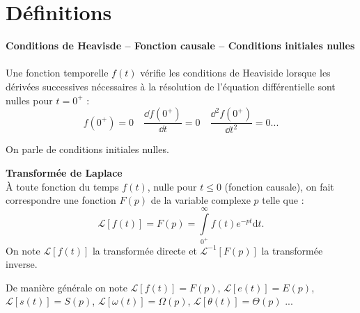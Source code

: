 \fichetrue
\proftrue
\tdfalse
\coursfalse

\def\xxnumchapitre{Chapitre 2 \vspace{.2cm}}
\def\xxchapitre{\hspace{.12cm} Modéliser les systèmes asservis -- Transformée de Laplace}
\def\xxYCartouche{-2.25cm}
\def\xxposongletx{2}
\def\xxposonglettext{1.45}
\def\xxposonglety{19}%

\def\xxonglet{Cy 01 -- Ch 2}

\def\xxactivite{Fiche}


\def\xxpied{%
Cycle 01 -- Modéliser le comportement des systèmes multiphysiques\\
Ch 2 -- \xxactivite%
}

\setcounter{secnumdepth}{5}

\iflivret

\else

\fi
\vspace{.5cm}
\pagestyle{fancy}
\thispagestyle{plain}
\setcounter{section}{0}


\section{Définitions}


\begin{defi} \textbf{\textsf{Conditions de Heavisde -- Fonction causale -- Conditions initiales nulles}} ~\\

Une fonction temporelle $f(t)$ vérifie les conditions de Heaviside lorsque les dérivées successives nécessaires à la résolution de l'équation différentielle sont nulles pour $t={0^{+}}$ :
$$
f({0^{+}})=0 \quad \dfrac{\dd f({0^{+}})}{\dd t} = 0 \quad \dfrac{\dd^2f({0^{+}})}{\dd t^2} = 0 ...
$$

On parle de conditions initiales nulles.

\end{defi}

\begin{defi} \textbf{\textsf{Transformée de Laplace}}~\\
À toute fonction du temps $f(t)$, nulle pour $t\leq0$ (fonction causale), on fait correspondre une fonction $F(p)$ de la variable complexe $p$ telle que :
$$
\mathcal{L}\left[f(t)\right] = F(p)=\int\limits_{0^{+}}^\infty f(t)e^{-pt}\text{d}t.
$$
On note $\mathcal{L}\left[f(t)\right]$ la transformée directe et $\mathcal{L}^{-1}\left[F(p)\right]$ la transformée inverse.

\noindent De manière générale on note 
$\mathcal{L}\left[f(t)\right] = F(p)$,
$\mathcal{L}\left[e(t)\right] = E(p)$,
$\mathcal{L}\left[s(t)\right] = S(p)$,
$\mathcal{L}\left[\omega(t)\right] = \Omega(p)$,
$\mathcal{L}\left[\theta(t)\right] = \Theta(p)$ ...

\end{defi}


